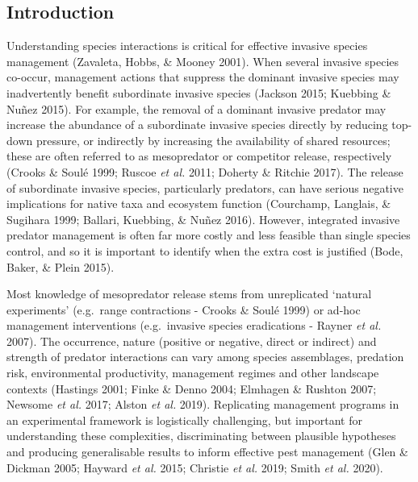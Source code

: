 \documentclass[11pt,a4paper,titlepage,twoside,openright]{style/unimelbthesis}
\begin{document}
\begin{mainmatter}
\hypertarget{introduction-2}{%
\section{Introduction}\label{introduction-2}}

Understanding species interactions is critical for effective invasive species management (Zavaleta, Hobbs, \& Mooney 2001). When several invasive species co-occur, management actions that suppress the dominant invasive species may inadvertently benefit subordinate invasive species (Jackson 2015; Kuebbing \& Nuñez 2015). For example, the removal of a dominant invasive predator may increase the abundance of a subordinate invasive species directly by reducing top-down pressure, or indirectly by increasing the availability of shared resources; these are often referred to as mesopredator or competitor release, respectively (Crooks \& Soulé 1999; Ruscoe \emph{et al.} 2011; Doherty \& Ritchie 2017). The release of subordinate invasive species, particularly predators, can have serious negative implications for native taxa and ecosystem function (Courchamp, Langlais, \& Sugihara 1999; Ballari, Kuebbing, \& Nuñez 2016). However, integrated invasive predator management is often far more costly and less feasible than single species control, and so it is important to identify when the extra cost is justified (Bode, Baker, \& Plein 2015).

Most knowledge of mesopredator release stems from unreplicated `natural experiments' (e.g.~range contractions - Crooks \& Soulé 1999) or ad-hoc management interventions (e.g.~invasive species eradications - Rayner \emph{et al.} 2007). The occurrence, nature (positive or negative, direct or indirect) and strength of predator interactions can vary among species assemblages, predation risk, environmental productivity, management regimes and other landscape contexts (Hastings 2001; Finke \& Denno 2004; Elmhagen \& Rushton 2007; Newsome \emph{et al.} 2017; Alston \emph{et al.} 2019). Replicating management programs in an experimental framework is logistically challenging, but important for understanding these complexities, discriminating between plausible hypotheses and producing generalisable results to inform effective pest management (Glen \& Dickman 2005; Hayward \emph{et al.} 2015; Christie \emph{et al.} 2019; Smith \emph{et al.} 2020).


\end{mainmatter}
\end{document}
